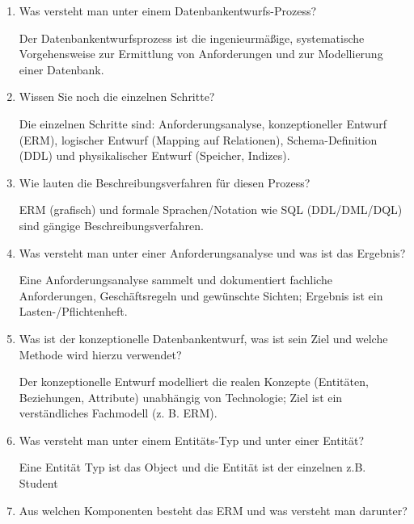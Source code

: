 \documentclass[a4paper]{article}
\begin{document}
\begin{enumerate}
    Data Dictionary ist die Verwaltung der Metadaten (Schemata [Attribute, Datentypen] , Statistiken, Zugriffsrechte, \dots). 
     
    Anfrageverwaltung (Query Processor/Optimizer) analysiert, optimiert und plant die Ausführung von Abfragen. 
     
    Transaktionsmanager sorgt für ACID-Eigenschaften (Atomicity, Consistency, Isolation, Durability) und koordiniert Transaktionen.
     
    Recovery-Manager stellt nach Fehlern die Konsistenz wieder her (Logging, Checkpoints, Wiederherstellung).
    \item Was versteht man unter einem Datenbankentwurfs-Prozess?
    
    Der Datenbankentwurfsprozess ist die ingenieurmäßige, systematische Vorgehensweise zur Ermittlung von Anforderungen und zur Modellierung einer Datenbank.
    \item Wissen Sie noch die einzelnen Schritte?

    Die einzelnen Schritte sind: Anforderungsanalyse, konzeptioneller Entwurf (ERM), logischer Entwurf (Mapping auf Relationen), Schema-Definition (DDL) und physikalischer Entwurf (Speicher, Indizes).
    \item Wie lauten die Beschreibungsverfahren für diesen Prozess?

    ERM (grafisch) und formale Sprachen/Notation wie SQL (DDL/DML/DQL) sind gängige Beschreibungsverfahren.
    \item Was versteht man unter einer Anforderungsanalyse und was ist das Ergebnis?

    Eine Anforderungsanalyse sammelt und dokumentiert fachliche Anforderungen, Geschäftsregeln und gewünschte Sichten; Ergebnis ist ein Lasten-/Pflichtenheft.
    \item Was ist der konzeptionelle Datenbankentwurf, was ist sein Ziel und welche Methode wird hierzu verwendet?

    Der konzeptionelle Entwurf modelliert die realen Konzepte (Entitäten, Beziehungen, Attribute) unabhängig von Technologie; Ziel ist ein verständliches Fachmodell (z. B. ERM).
    \item Was versteht man unter einem Entitäts-Typ und unter einer Entität?
    
    Eine Entität Typ ist das Object und die Entität ist der einzelnen z.B. Student
    \item Aus welchen Komponenten besteht das ERM und was versteht man darunter?
    

\end{enumerate}
\end{document}
